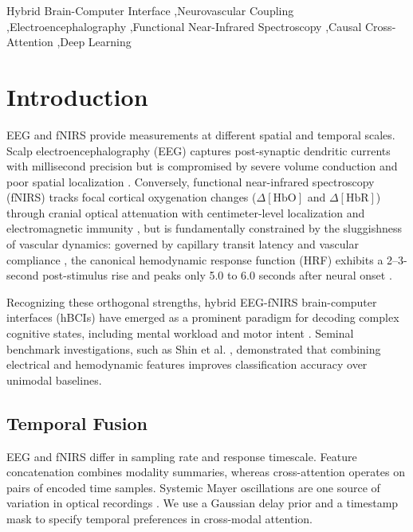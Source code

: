 \documentclass[final,5p,times,twocolumn]{elsarticle}
\begin{document}
\begin{frontmatter}
\begin{keyword}
Hybrid Brain-Computer Interface \sep Neurovascular Coupling \sep Electroencephalography \sep Functional Near-Infrared Spectroscopy \sep Causal Cross-Attention \sep Deep Learning
\end{keyword}

\end{frontmatter}

\section{Introduction}
\label{sec:intro}
EEG and fNIRS provide measurements at different spatial and temporal scales. Scalp electroencephalography (EEG) captures post-synaptic dendritic currents with millisecond precision but is compromised by severe volume conduction and poor spatial localization \cite{buzsaki2012origin}. Conversely, functional near-infrared spectroscopy (fNIRS) tracks focal cortical oxygenation changes ($\Delta[\text{HbO}]$ and $\Delta[\text{HbR}]$) through cranial optical attenuation with centimeter-level localization and electromagnetic immunity \cite{delpy1988estimation, scholkmann2014review}, but is fundamentally constrained by the sluggishness of vascular dynamics: governed by capillary transit latency and vascular compliance \cite{buxton1998dynamics, strangman2002non}, the canonical hemodynamic response function (HRF) exhibits a 2--3-second post-stimulus rise and peaks only 5.0 to 6.0 seconds after neural onset \cite{friston1998event, glover1999deconvolution, pinti2019present}.

Recognizing these orthogonal strengths, hybrid EEG-fNIRS brain-computer interfaces (hBCIs) have emerged as a prominent paradigm for decoding complex cognitive states, including mental workload and motor intent \cite{hong2017future, fazli2012enhanced, buccino2016hybrid, yin2015review}. Seminal benchmark investigations, such as Shin et al. \cite{shin2017open}, demonstrated that combining electrical and hemodynamic features improves classification accuracy over unimodal baselines.

\subsection{Temporal Fusion}
EEG and fNIRS differ in sampling rate and response timescale. Feature concatenation combines modality summaries, whereas cross-attention operates on pairs of encoded time samples. Systemic Mayer oscillations are one source of variation in optical recordings \cite{julien2006enigma}. We use a Gaussian delay prior and a timestamp mask to specify temporal preferences in cross-modal attention.
\end{document}
